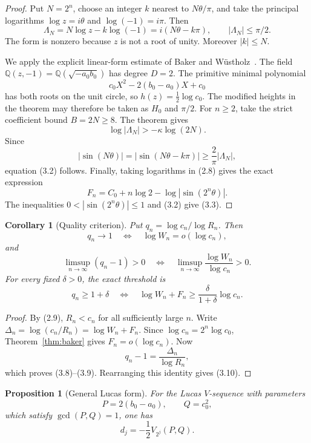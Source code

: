 \documentclass[11pt]{article}
\newtheorem{proposition}[theorem]{Proposition}
\newtheorem{corollary}[theorem]{Corollary}
\theoremstyle{remark}
\newcommand{\QQ}{\mathbb{Q}}
\begin{document}
\begin{proof}
Put \(N=2^n\), choose an integer \(k\) nearest to \(N\theta/\pi\), and
take the principal logarithms \(\log z=i\theta\) and
\(\log(-1)=i\pi\).  Then
\[
 \Lambda_N=N\log z-k\log(-1)
           =i(N\theta-k\pi),\qquad |\Lambda_N|\leq\pi/2.  \tag{3.5}
\]
The form is nonzero because \(z\) is not a root of unity.  Moreover
\(|k|\leq N\).

We apply the explicit linear-form estimate of Baker and
Wüstholz~\cite[Theorem~1]{BakerWustholz1993}.  The field
\(\QQ(z,-1)=\QQ(\sqrt{-a_0b_0})\) has degree \(D=2\).  The primitive
minimal polynomial
\[
 c_0X^2-2(b_0-a_0)X+c_0
\]
has both roots on the unit circle, so \(h(z)=\frac12\log c_0\).
The modified heights in the theorem may therefore be taken as \(H_0\)
and \(\pi/2\).  For \(n\geq2\), take the strict coefficient bound
\(B=2N\geq8\).
The theorem gives
\[
 \log|\Lambda_N|>-\kappa\log(2N).                         \tag{3.6}
\]
Since
\[
 |\sin(N\theta)|
 =|\sin(N\theta-k\pi)|
 \geq\frac{2}{\pi}|\Lambda_N|,
\]
equation (3.2) follows.  Finally, taking logarithms in (2.8) gives the
exact expression
\[
 F_n=C_0+n\log2-\log|\sin(2^n\theta)|.                    \tag{3.7}
\]
The inequalities \(0<|\sin(2^n\theta)|\leq1\) and (3.2) give (3.3).
\end{proof}

\begin{corollary}[Quality criterion]\label{cor:quality}
Put \(q_n=\log c_n/\log R_n\).  Then
\[
 q_n\longrightarrow1
 \quad\Longleftrightarrow\quad
 \log W_n=o(\log c_n),                                    \tag{3.8}
\]
and
\[
 \limsup_{n\to\infty}(q_n-1)>0
 \quad\Longleftrightarrow\quad
 \limsup_{n\to\infty}\frac{\log W_n}{\log c_n}>0.          \tag{3.9}
\]
For every fixed \(\delta>0\), the exact threshold is
\[
 q_n\geq1+\delta
 \quad\Longleftrightarrow\quad
 \log W_n+F_n\geq
 \frac{\delta}{1+\delta}\log c_n.                         \tag{3.10}
\]
\end{corollary}

\begin{proof}
By (2.9), \(R_n<c_n\) for all sufficiently large \(n\).  Write
\(\Delta_n=\log(c_n/R_n)=\log W_n+F_n\).  Since
\(\log c_n=2^n\log c_0\), Theorem~\ref{thm:baker} gives
\(F_n=o(\log c_n)\).  Now
\[
 q_n-1=\frac{\Delta_n}{\log R_n},
\]
which proves (3.8)--(3.9).  Rearranging this identity gives (3.10).
\end{proof}

\begin{proposition}[General Lucas form]\label{prop:general-lucas}
For the Lucas \(V\)-sequence with parameters
\[
 P=2(b_0-a_0),\qquad Q=c_0^2,
\]
which satisfy \(\gcd(P,Q)=1\), one has
\[
 d_j=-\frac12V_{2^j}(P,Q).                                \tag{3.11}
\]
\end{proposition}
\end{document}
